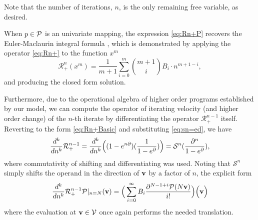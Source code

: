 Note that the number of iterations, $n$, is the only remaining free variable, as desired.
\begin{remark}
  When $p\in\mathcal{P}$ is an univariate mapping, the expression \eqref{eq:Rn+P} recovers the Euler-Maclaurin integral formula \cite{apostol1999elementary}, which is demonstrated by applying the operator \eqref{eq:Rn+} to the function $x^m$
$$\mathcal{R}^n_+(x^m)=\frac{1}{m+1}\sum_{i=0}^m{m+1\choose i}B_i\cdot n^{m+1-i},$$
and producing the closed form solution.
\end{remark}
Furthermore, due to the operational algebra of higher order programs established by our model, we can compute the operator of iterating velocity (and higher order change) of the $n$-th iterate by differentiating the operator $\mathcal{R}^{n-1}_+$ itself. Reverting to the form \eqref{eq:Rn+Basic} and substituting \eqref{eq:sn=ed}, we have
\begin{equation}
  \frac{d^k}{dn^k}\mathcal{R}^{n-1}_+=\frac{d^k}{dn^k}\Big((1-e^{n\partial})(\frac{1}{1-e^\partial})\Big)=\mathcal{S}^n(\frac{\partial^n}{1-e^\partial}),
   \end{equation}
where commutativity of shifting and differentiating was used. Noting that $\mathcal{S}^n$ simply shifts the operand in the direction of $\mathbf{v}$ by a factor of $n$, the explicit form 
\begin{equation}
        \frac{d^k}{dn^k}\mathcal{R}^{n-1}_+\mathcal{P}\vert_{n=N}(\mathbf{v})=\Big(\sum\limits_{i=0}^{\infty}B_i\frac{\partial^{N-1+i}\mathcal{P}(N\mathbf{v})}{i!}\Big)\Big(\mathbf{v}\Big)
        \end{equation}
where the evaluation at $\mathbf{v}\in \mathcal{V}$ once again performs the needed translation.

